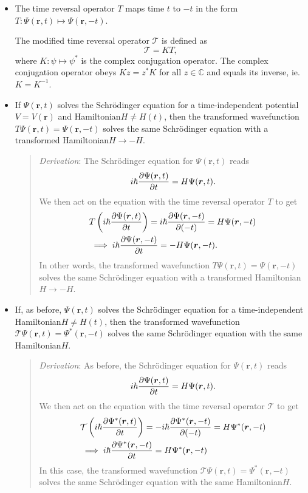 \documentclass[11pt, a4paper]{article}
\newcommand{\Schro}{Schr\"{o}dinger\xspace}
\newcommand{\Ham}{Hamiltonian\xspace}
\renewcommand{\vec}[1]{\bm{#1}}  %
\renewcommand{\r}{\vec{r}}  %
\newcommand{\T}{\mathcal{T}}  %
\renewcommand{\P}{\Psi}  %
\begin{document}
\begin{itemize}
	\item The time reversal operator $ T $ maps time $ t $ to $ -t $ in the form $ T: \P(\r, t) \mapsto \P(\r, -t) $.

    The modified time reversal operator $ \T $ is defined as 
    \begin{equation*}
        \T = KT,
    \end{equation*}
    where $ K : \psi \mapsto \psi^{*} $ is the complex conjugation operator. The complex conjugation operator obeys $ K z = z^{*}K $ for all $ z \in \mathbb{C} $ and equals its inverse, ie. $ K = K^{-1} $. 

	\item If $ \P(\r, t) $ solves the \Schro equation for a time-independent potential $ V = V(\r) $ and \Ham $ H \neq H(t) $, then the transformed wavefunction $ T\P(\r, t) = \P(\r, -t) $ solves the same \Schro equation with a transformed \Ham $ H \to - H $.
    \begin{quote}
        \textit{Derivation}: The \Schro equation for $ \P(\r, t) $ reads
        \begin{equation*}
            i \hbar \pdv{\P(\r, t)}{t} = H \P(\r, t).
        \end{equation*}
        We then act on the equation with the time reversal operator $ T $ to get
        \begin{align*}
            & T\left(i \hbar \pdv{\P(\r, t)}{t}\right) = i \hbar \pdv{\P(\r, -t)}{(-t)} = H \P(\r, -t)  \\
            & \implies i \hbar \pdv{\P(\r, -t)}{t} = -H \P(\r, -t).
        \end{align*}
        In other words, the transformed wavefunction $ T\P(\r, t) = \P(\r, -t) $ solves the same \Schro equation with a transformed \Ham $ H \to - H $.
    \end{quote}

	\item If, as before, $ \P(\r, t) $ solves the \Schro equation for a time-independent \Ham $ H \neq H(t) $, then the transformed wavefunction $ \T\P(\r, t) = \P^{*}(\r, -t) $ solves the same \Schro equation with the same \Ham $ H $.
    \begin{quote}
        \textit{Derivation}: As before, the \Schro equation for $ \P(\r, t) $ reads        \begin{equation*}
            i \hbar \pdv{\P(\r, t)}{t} = H \P(\r, t).
        \end{equation*}
        We then act on the equation with the time reversal operator $ \T $ to get
        \begin{align*}
            & \T\left(i \hbar \pdv{\P^{*}(\r, t)}{t}\right) = -i \hbar \pdv{\P^{*}(\r, -t)}{(-t)} = H \P^{*}(\r, -t) \\
            & \implies i \hbar \pdv{\P^{*}(\r, -t)}{t} = H \P^{*}(\r, -t) 
        \end{align*}
        In this case, the transformed wavefunction $ \T\P(\r, t) = \P^{*}(\r, -t) $ solves the same \Schro equation with the same \Ham $ H $.
    \end{quote}
	

\end{itemize}
\end{document}
